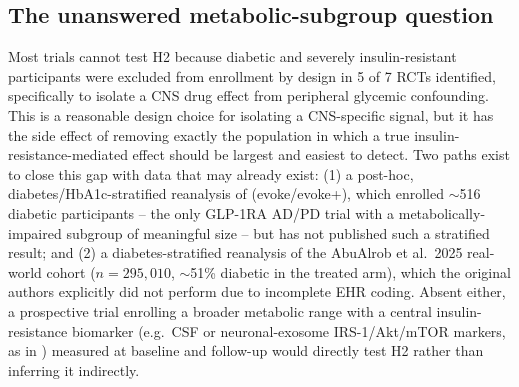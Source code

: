 \documentclass[11pt, a4paper]{article}
\begin{document}
\subsection{The unanswered metabolic-subgroup question}
Most trials cannot test H2 because diabetic and severely insulin-resistant
participants were excluded from enrollment by design in 5 of 7 RCTs
identified, specifically to isolate a CNS drug effect from peripheral
glycemic confounding. This is a reasonable design choice for isolating a
CNS-specific signal, but it has the side effect of removing exactly the
population in which a true insulin-resistance-mediated effect should be
largest and easiest to detect. Two paths exist to close this gap with data
that may already exist: (1) a post-hoc, diabetes/HbA1c-stratified
reanalysis of \citet{cummings2026} (evoke/evoke+), which enrolled
$\sim$516 diabetic participants -- the only GLP-1RA AD/PD trial with a
metabolically-impaired subgroup of meaningful size -- but has not published
such a stratified result; and (2) a diabetes-stratified reanalysis of the
AbuAlrob et al.\ 2025 real-world cohort ($n=295{,}010$, $\sim$51\% diabetic
in the treated arm), which the original authors explicitly did not perform
due to incomplete EHR coding. Absent either, a prospective trial enrolling
a broader metabolic range with a central insulin-resistance biomarker (e.g.\
CSF or neuronal-exosome IRS-1/Akt/mTOR markers, as in \citet{athauda2019})
measured at baseline and follow-up would directly test H2 rather than
inferring it indirectly.
\end{document}
